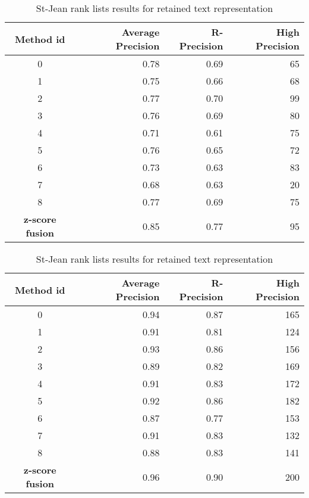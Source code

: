 \begin{table}[H]
  \centering
  \caption{St-Jean rank lists results for retained text representation}
  \label{tab:9rl_results_st_jean}

  \begin{tabular}{c r r r}
    \toprule
    Method id &
    Average Precision &
    R-Precision &
    High Precision \\
    \midrule
    0 & 0.78 & 0.69 & 65 \\
    1 & 0.75 & 0.66 & 68 \\
    2 & 0.77 & 0.70 & 99 \\
    3 & 0.76 & 0.69 & 80 \\
    4 & 0.71 & 0.61 & 75 \\
    5 & 0.76 & 0.65 & 72 \\
    6 & 0.73 & 0.63 & 83 \\
    7 & 0.68 & 0.63 & 20 \\
    8 & 0.77 & 0.69 & 75 \\
    \textbf{z-score fusion} & 0.85 & 0.77 & 95 \\
    \bottomrule
  \end{tabular}

  \label{tab:9rl_results_st_jean_B}
  \begin{tabular}{c r r r}
    \toprule
    Method id &
    Average Precision &
    R-Precision &
    High Precision \\
    \midrule
    0 & 0.94 & 0.87 & 165 \\
    1 & 0.91 & 0.81 & 124 \\
    2 & 0.93 & 0.86 & 156 \\
    3 & 0.89 & 0.82 & 169 \\
    4 & 0.91 & 0.83 & 172 \\
    5 & 0.92 & 0.86 & 182 \\
    6 & 0.87 & 0.77 & 153 \\
    7 & 0.91 & 0.83 & 132 \\
    8 & 0.88 & 0.83 & 141 \\
    \textbf{z-score fusion} & 0.96 & 0.90 & 200 \\
    \bottomrule
  \end{tabular}


\end{table}
